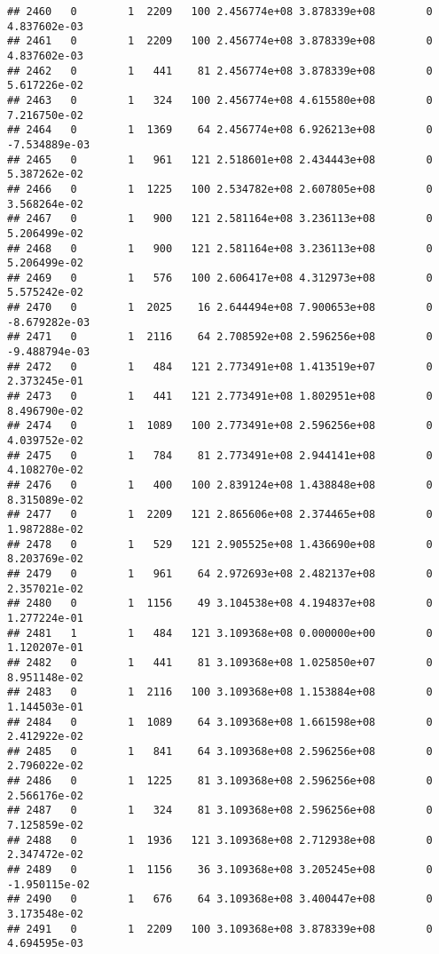 \documentclass[
]{article}
\begin{document}
\begin{enumerate}
\begin{verbatim}
## 2460   0        1  2209   100 2.456774e+08 3.878339e+08        0  4.837602e-03
## 2461   0        1  2209   100 2.456774e+08 3.878339e+08        0  4.837602e-03
## 2462   0        1   441    81 2.456774e+08 3.878339e+08        0  5.617226e-02
## 2463   0        1   324   100 2.456774e+08 4.615580e+08        0  7.216750e-02
## 2464   0        1  1369    64 2.456774e+08 6.926213e+08        0 -7.534889e-03
## 2465   0        1   961   121 2.518601e+08 2.434443e+08        0  5.387262e-02
## 2466   0        1  1225   100 2.534782e+08 2.607805e+08        0  3.568264e-02
## 2467   0        1   900   121 2.581164e+08 3.236113e+08        0  5.206499e-02
## 2468   0        1   900   121 2.581164e+08 3.236113e+08        0  5.206499e-02
## 2469   0        1   576   100 2.606417e+08 4.312973e+08        0  5.575242e-02
## 2470   0        1  2025    16 2.644494e+08 7.900653e+08        0 -8.679282e-03
## 2471   0        1  2116    64 2.708592e+08 2.596256e+08        0 -9.488794e-03
## 2472   0        1   484   121 2.773491e+08 1.413519e+07        0  2.373245e-01
## 2473   0        1   441   121 2.773491e+08 1.802951e+08        0  8.496790e-02
## 2474   0        1  1089   100 2.773491e+08 2.596256e+08        0  4.039752e-02
## 2475   0        1   784    81 2.773491e+08 2.944141e+08        0  4.108270e-02
## 2476   0        1   400   100 2.839124e+08 1.438848e+08        0  8.315089e-02
## 2477   0        1  2209   121 2.865606e+08 2.374465e+08        0  1.987288e-02
## 2478   0        1   529   121 2.905525e+08 1.436690e+08        0  8.203769e-02
## 2479   0        1   961    64 2.972693e+08 2.482137e+08        0  2.357021e-02
## 2480   0        1  1156    49 3.104538e+08 4.194837e+08        0  1.277224e-01
## 2481   1        1   484   121 3.109368e+08 0.000000e+00        0  1.120207e-01
## 2482   0        1   441    81 3.109368e+08 1.025850e+07        0  8.951148e-02
## 2483   0        1  2116   100 3.109368e+08 1.153884e+08        0  1.144503e-01
## 2484   0        1  1089    64 3.109368e+08 1.661598e+08        0  2.412922e-02
## 2485   0        1   841    64 3.109368e+08 2.596256e+08        0  2.796022e-02
## 2486   0        1  1225    81 3.109368e+08 2.596256e+08        0  2.566176e-02
## 2487   0        1   324    81 3.109368e+08 2.596256e+08        0  7.125859e-02
## 2488   0        1  1936   121 3.109368e+08 2.712938e+08        0  2.347472e-02
## 2489   0        1  1156    36 3.109368e+08 3.205245e+08        0 -1.950115e-02
## 2490   0        1   676    64 3.109368e+08 3.400447e+08        0  3.173548e-02
## 2491   0        1  2209   100 3.109368e+08 3.878339e+08        0  4.694595e-03

\end{verbatim}
\end{enumerate}
\end{document}

